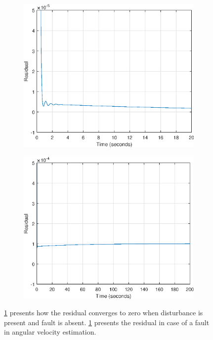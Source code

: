 \begin{figure}[H]
	\begin{subfigure}{0.5\linewidth}
			\centering
		\includegraphics[width=1\linewidth]{figures/nosensfault_res}
		\label{fig:nosensfault_res}
	\end{subfigure}
		\begin{subfigure}{0.5\linewidth}
	\centering
\includegraphics[width=1\linewidth]{figures/sensfault_res}
\label{fig:sensfault_res}	
	\end{subfigure}
\caption{\ref{fig:nosensfault_res} presents how the residual converges to zero when disturbance is present and fault is absent. \ref{fig:nosensfault_res} presents the residual in case of a fault in angular velocity estimation.}
\end{figure}

